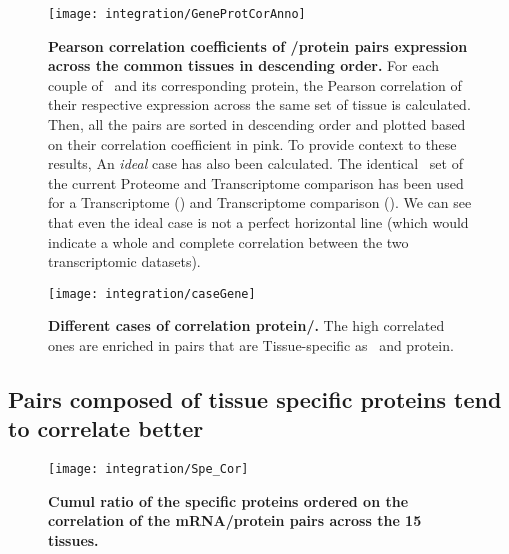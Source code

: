 \begin{figure}[!htbp]
    \texttt{[image: integration/GeneProtCorAnno]}\centering
    \caption[Pearson correlation coefficients of \mRNA/protein pairs expression
    across the common tissues in descending order]
    {\label{GeneProtCor}\textbf{Pearson correlation coefficients of \mRNA/protein
    pairs expression across the common tissues in descending order.} For each
    couple of \mRNA\ and its corresponding protein, the Pearson correlation of
    their respective expression across the same set of tissue is calculated. Then,
    all the pairs are sorted in descending order and plotted based on their
    correlation coefficient in pink. To provide context to these results,
    An \emph{ideal} case has also been calculated. The identical \mRNAs\ set of
    the current Proteome and Transcriptome comparison has been used for a
    Transcriptome () and Transcriptome comparison
    (). We can see that even the ideal case is not a perfect
    horizontal line (which would indicate a whole and complete correlation between
    the two transcriptomic datasets).}
\end{figure}


\begin{figure}[!htbp]
\texttt{[image: integration/caseGene]}\centering
    \caption[Different cases of correlation
    protein/mRNA]{\label{fig:caseGene}\textbf{Different cases of correlation
    protein/\mRNA.} The high correlated ones are enriched in pairs that are
    Tissue-specific as \mRNA\ and protein.}
\end{figure}

\subsection{Pairs composed of tissue specific proteins tend to correlate better}

\begin{figure}[!htbp]
    \texttt{[image: integration/Spe\_Cor]}\centering
    \caption[Cumul ratio of the specific proteins ordered on the correlation
    of the mRNA/protein pairs across the 15
    tissues]{\label{fig:Spe_Cor}\textbf{Cumul ratio of the specific proteins
    ordered on the correlation of the mRNA/protein pairs across the 15 tissues.}}
\end{figure}




